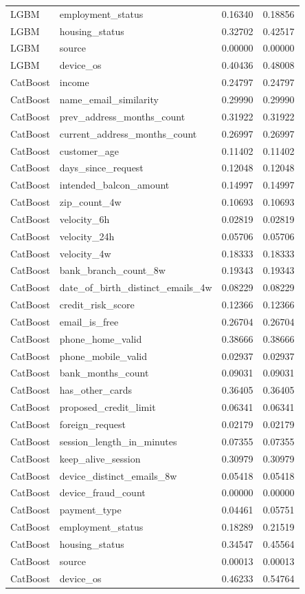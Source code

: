 \begin{longtable}{@{}llrr@{}}
LGBM & employment\_status & 0.16340 & 0.18856 \\
LGBM & housing\_status & 0.32702 & 0.42517 \\
LGBM & source & 0.00000 & 0.00000 \\
LGBM & device\_os & 0.40436 & 0.48008 \\
CatBoost & income & 0.24797 & 0.24797 \\
CatBoost & name\_email\_similarity & 0.29990 & 0.29990 \\
CatBoost & prev\_address\_months\_count & 0.31922 & 0.31922 \\
CatBoost & current\_address\_months\_count & 0.26997 & 0.26997 \\
CatBoost & customer\_age & 0.11402 & 0.11402 \\
CatBoost & days\_since\_request & 0.12048 & 0.12048 \\
CatBoost & intended\_balcon\_amount & 0.14997 & 0.14997 \\
CatBoost & zip\_count\_4w & 0.10693 & 0.10693 \\
CatBoost & velocity\_6h & 0.02819 & 0.02819 \\
CatBoost & velocity\_24h & 0.05706 & 0.05706 \\
CatBoost & velocity\_4w & 0.18333 & 0.18333 \\
CatBoost & bank\_branch\_count\_8w & 0.19343 & 0.19343 \\
CatBoost & date\_of\_birth\_distinct\_emails\_4w & 0.08229 & 0.08229 \\
CatBoost & credit\_risk\_score & 0.12366 & 0.12366 \\
CatBoost & email\_is\_free & 0.26704 & 0.26704 \\
CatBoost & phone\_home\_valid & 0.38666 & 0.38666 \\
CatBoost & phone\_mobile\_valid & 0.02937 & 0.02937 \\
CatBoost & bank\_months\_count & 0.09031 & 0.09031 \\
CatBoost & has\_other\_cards & 0.36405 & 0.36405 \\
CatBoost & proposed\_credit\_limit & 0.06341 & 0.06341 \\
CatBoost & foreign\_request & 0.02179 & 0.02179 \\
CatBoost & session\_length\_in\_minutes & 0.07355 & 0.07355 \\
CatBoost & keep\_alive\_session & 0.30979 & 0.30979 \\
CatBoost & device\_distinct\_emails\_8w & 0.05418 & 0.05418 \\
CatBoost & device\_fraud\_count & 0.00000 & 0.00000 \\
CatBoost & payment\_type & 0.04461 & 0.05751 \\
CatBoost & employment\_status & 0.18289 & 0.21519 \\
CatBoost & housing\_status & 0.34547 & 0.45564 \\
CatBoost & source & 0.00013 & 0.00013 \\
CatBoost & device\_os & 0.46233 & 0.54764 \\
\bottomrule
\end{longtable}
